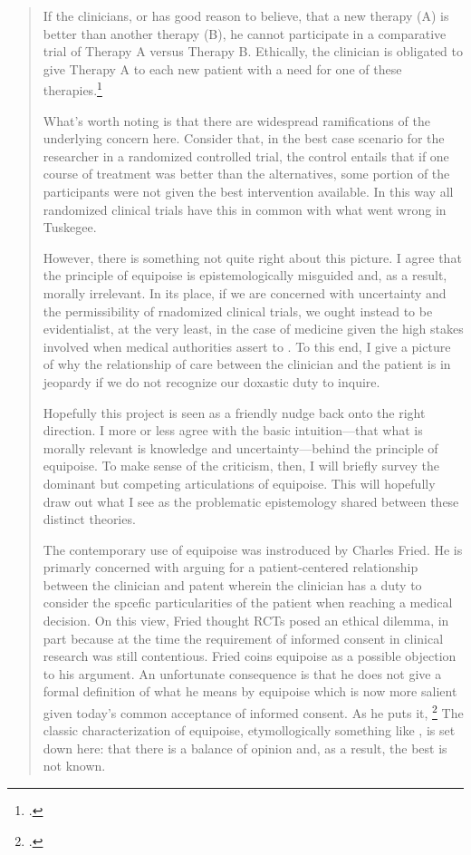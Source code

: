 \documentclass[letterpaper,notitlepage,12pt]{article}
\begin{document}
\blockquote{If the clinicians, or has good reason to believe, that a new
  therapy (A) is better than another therapy (B), he cannot participate in a
  comparative trial of Therapy A versus Therapy B. Ethically, the clinician is
  obligated to give Therapy A to each new patient with a need for one of these
  therapies.\footcite[p. 487]{shaw_ethics_1970}

What's worth noting is that there are widespread ramifications of the
underlying concern here.
Consider that, in the best case scenario for the researcher in a randomized
controlled trial, the control entails that if one course of treatment was better
than the alternatives, some portion of the participants were not given the best
intervention available.
In this way all randomized clinical trials have this in common with what went
wrong in Tuskegee.

However, there is something not quite right about this picture.
I agree that the principle of equipoise is epistemologically misguided and, as a
result, morally irrelevant.
In its place, if we are concerned with uncertainty and the permissibility of
rnadomized clinical trials, we ought instead to be evidentialist, at the very
least, in the case of medicine given the high stakes involved when medical
authorities assert to .
To this end, I give a picture of why the relationship of care between the
clinician and the patient is in jeopardy if we do not recognize our doxastic
duty to inquire.

Hopefully this project is seen as a friendly nudge back onto the right
direction.
I more or less agree with the basic intuition---that what is morally relevant is
knowledge and uncertainty---behind the principle of equipoise.
To make sense of the criticism, then, I will briefly survey the dominant but
competing articulations of equipoise.
This will hopefully draw out what I see as the problematic epistemology shared
between these distinct theories.

The contemporary use of equipoise was instroduced by Charles Fried.
He is primarly concerned with arguing for a patient-centered relationship
between the clinician and patent wherein the clinician has a duty to consider
the spcefic particularities of the patient when reaching a medical decision.
On this view, Fried thought RCTs posed an ethical dilemma, in part because at
the time the requirement of informed consent in clinical research was still
contentious.
Fried coins equipoise as a possible objection to his argument.
An unfortunate consequence is that he does not give a formal definition of what
he means by equipoise which is now more salient given today's common acceptance
of informed consent.
As he puts it, \footcite[p. 58]{fried_medical_2016}
The classic characterization of equipoise, etymollogically something like
, is set down here: that there is a balance of opinion
and, as a result, the best is not known.

}
\end{document}
